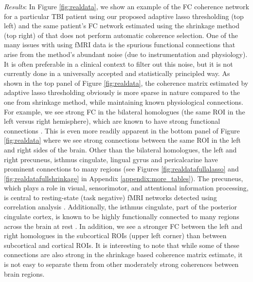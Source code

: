 \textit{Results}: In Figure \ref{fig:realdata}, we show an example of the FC coherence network for a particular TBI patient using our proposed adaptive lasso thresholding (top left) and the same patient's FC network estimated using the shrinkage method (top right) of \cite{bohm2009shrinkage} that does not perform automatic coherence selection. One of the many issues with using fMRI data is the spurious functional connections that arise from the method's abundant noise (due to instrumentation and physiology). It is often preferable in a clinical context to filter out this noise, but it is not currently done in a universally accepted and statistically principled way. As shown in the top panel of Figure \ref{fig:realdata}, the coherence matrix estimated by adaptive lasso thresholding obviously is more sparse in nature compared to the one from shrinkage method, while maintaining known physiological connections. For example, we see strong FC in the bilateral homologues (the same ROI in the left versus right hemisphere), which are known to have strong functional connections \citep{zuo2010growing}. This is even more readily apparent in the bottom panel of Figure \ref{fig:realdata} where we see strong connections between the same ROI in the left and right sides of the brain. Other than the bilateral homologues, the left and right precuneus, isthmus cingulate, lingual gyrus and pericalcarine have prominent connections to many regions (see Figures \ref{fig:realdatafullalasso} and \ref{fig:realdatafullshrinkage} in Appendix \ref{appendix:more_tables}). The precuneus, which plays a role in visual, sensorimotor, and attentional information processing, is central to resting-state (task negative) fMRI networks detected using correlation analysis \citep{Utevsky14}. Additionally, the isthmus cingulate, part of the posterior cingulate cortex, is known to be highly functionally connected to many regions across the brain at rest \citep{FRANSSON20081178}. In addition, we see a stronger FC between the left and right homologues in the subcortical ROIs (upper left corner) than between subcortical and cortical ROIs. It is interesting to note that while some of these connections are also strong in the shrinkage based coherence matrix estimate, it is not easy to separate them from other moderately strong coherences between brain regions.



